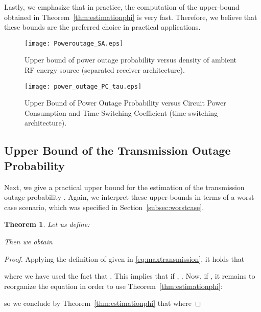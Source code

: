 \documentclass[12pt,draftclsnofoot,onecolumn]{IEEEtran}
\newtheorem{theorem}{Theorem}
\begin{document}
Lastly, we emphasize that in practice, the computation of the upper-bound obtained in Theorem~\ref{thm:estimationphi} is very fast. Therefore, we believe that these bounds are the preferred choice in practical applications.

 \begin{figure}
 \centering
  \begin{minipage}[c]{0.48\textwidth}
          \texttt{[image: Poweroutage\_SA.eps]}
           \caption{Upper bound of power outage probability versus density of ambient RF energy source (separated receiver architecture).}  \label{fig:power_outage_SA}          
    \end{minipage}
  \begin{minipage}[c]{0.48\textwidth}
          \texttt{[image: power\_outage\_PC\_tau.eps]}
            \caption{Upper Bound of Power Outage Probability versus Circuit Power Consumption and Time-Switching Coefficient  (time-switching architecture).}   \label{fig:power_outage_PC_tau}     
  \end{minipage}
  \end{figure}






\subsection{Upper Bound of the Transmission Outage Probability}
 
  
Next, we give a practical upper bound for the estimation of the transmission outage probability . Again, we interpret these upper-bounds in terms of a worst-case scenario, which was specified in Section~\ref{subsec:worstcase}. 
\begin{theorem}
\label{thm:transmissionoutage}
Let us define:

Then we obtain

\end{theorem}
\begin{proof}
Applying the definition of  given in \eqref{eq:maxtransmission}, it holds that

where we have used the fact that . This implies that if , . Now, if , it remains to reorganize the equation in order to use Theorem~\ref{thm:estimationphi}:

so we conclude by Theorem~\ref{thm:estimationphi} that 
where 

\end{proof}  
\end{document}
